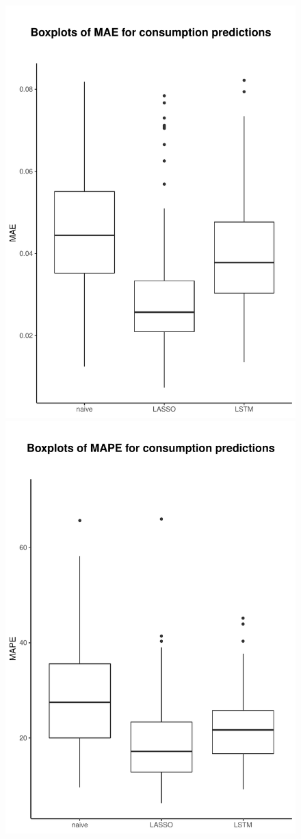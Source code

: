 %
\begin{figure}
    \centering
    \includegraphics[width=.5\textwidth-0.15em]{thesis/graphs/evaluation/c_boxplot_MAE.pdf}
    \includegraphics[width=.5\textwidth-0.15em]{thesis/graphs/evaluation/c_boxplot_MAPE.pdf} \\
    

\end{figure}
